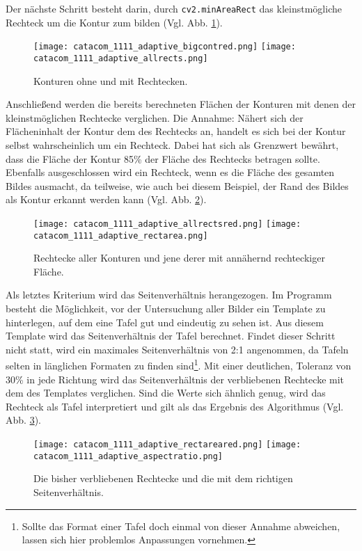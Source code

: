 Der nächste Schritt besteht darin, durch \verb|cv2.minAreaRect| das kleinstmögliche Rechteck um die Kontur zum bilden (Vgl. Abb. \ref{fig:adaptiverectangles}).
\begin{figure}[h!]
\texttt{[image: catacom\_1111\_adaptive\_bigcontred.png]}
\texttt{[image: catacom\_1111\_adaptive\_allrects.png]}
\caption{Konturen ohne und mit Rechtecken.}
\label{fig:adaptiverectangles}
\end{figure}

Anschließend werden die bereits berechneten Flächen der Konturen mit denen der kleinstmöglichen Rechtecke verglichen. Die Annahme: Nähert sich der Flächeninhalt der Kontur dem des Rechtecks an, handelt es sich bei der Kontur selbst wahrscheinlich um ein Rechteck. Dabei hat sich als Grenzwert bewährt, dass die Fläche der Kontur 85\% der Fläche des Rechtecks betragen sollte. Ebenfalls ausgeschlossen wird ein Rechteck, wenn es die Fläche des gesamten Bildes ausmacht, da teilweise, wie auch bei diesem Beispiel, der Rand des Bildes als Kontur erkannt werden kann (Vgl. Abb. \ref{fig:adaptivrect}).
\begin{figure}[h!]
\texttt{[image: catacom\_1111\_adaptive\_allrectsred.png]}
\texttt{[image: catacom\_1111\_adaptive\_rectarea.png]}
\caption{Rechtecke aller Konturen und jene derer mit annähernd rechteckiger Fläche.}
\label{fig:adaptivrect}
\end{figure}

Als letztes Kriterium wird das Seitenverhältnis herangezogen. Im Programm besteht die Möglichkeit, vor der Untersuchung aller Bilder ein Template zu hinterlegen, auf dem eine Tafel gut und eindeutig zu sehen ist. Aus diesem Template wird das Seitenverhältnis der Tafel berechnet. Findet dieser Schritt nicht statt, wird ein maximales Seitenverhältnis von 2:1 angenommen, da Tafeln selten in länglichen Formaten zu finden sind\footnote{Sollte das Format einer Tafel doch einmal von dieser Annahme abweichen, lassen sich hier problemlos Anpassungen vornehmen.}. Mit einer deutlichen, Toleranz von 30\% in jede Richtung wird das Seitenverhältnis der verbliebenen Rechtecke mit dem des Templates verglichen. Sind die Werte sich ähnlich genug, wird das Rechteck als Tafel interpretiert und gilt als das Ergebnis des Algorithmus (Vgl. Abb. \ref{fig:aspectratio}).
\begin{figure}[h!]
\texttt{[image: catacom\_1111\_adaptive\_rectareared.png]}
\texttt{[image: catacom\_1111\_adaptive\_aspectratio.png]}
\caption{Die bisher verbliebenen Rechtecke und die mit dem richtigen Seitenverhältnis.}
\label{fig:aspectratio}
\end{figure}
 
